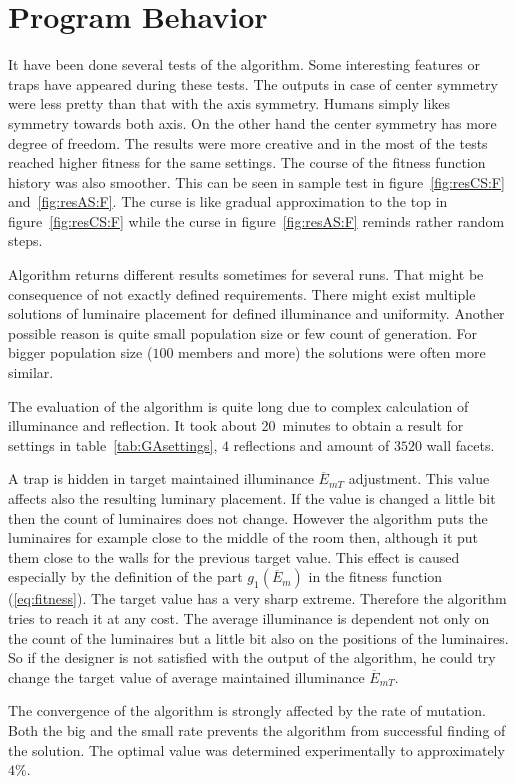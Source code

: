 \section{Program Behavior}
It have been done several tests of the algorithm. Some interesting features or traps have appeared during these tests. The outputs in case of center symmetry were less pretty than that with the axis symmetry. Humans simply likes symmetry towards both axis. On the other hand the center symmetry has more degree of freedom. The results were more creative and in the most of the tests reached higher fitness for the same settings. The course of the fitness function history was also smoother. This can be seen in sample test in figure~\ref{fig:resCS:F} and~\ref{fig:resAS:F}. The curse is like gradual approximation to the top in figure~\ref{fig:resCS:F} while the curse in figure~\ref{fig:resAS:F} reminds rather random steps.

Algorithm returns different results sometimes for several runs. That might be consequence of not exactly defined requirements. There might exist multiple solutions of luminaire placement for defined illuminance and uniformity. Another possible reason is quite small population size or few count of generation. For bigger population size ($100$ members and more) the solutions were often more similar.

The evaluation of the algorithm is quite long due to complex calculation of illuminance and reflection. It took about 20~minutes to obtain a result for settings in table~\ref{tab:GAsettings}, $4$ reflections and amount of $3520$ wall facets.

A trap is hidden in target maintained illuminance $\overline{E}_{mT}$ adjustment. This value affects also the resulting luminary placement. If the value is changed a little bit then the count of luminaires does not change. However the algorithm puts the luminaires for example close to the middle of the room then, although it put them close to the walls for the previous target value. This effect is caused especially by the definition of the part $g_1\left(\overline{E}_{m}\right)$ in the fitness function (\ref{eq:fitness}). The target value has a very sharp extreme. Therefore the algorithm tries to reach it at any cost. The average illuminance is dependent not only on the count of the luminaires but a little bit also on the positions of the luminaires. So if the designer is not satisfied with the output of the algorithm, he could try change the target value of average maintained illuminance $\overline{E}_{mT}$.

The convergence of the algorithm is strongly affected by the rate of mutation. Both the big and the small rate prevents the algorithm from successful finding of the solution. The optimal value was determined experimentally to approximately $4 \%$.